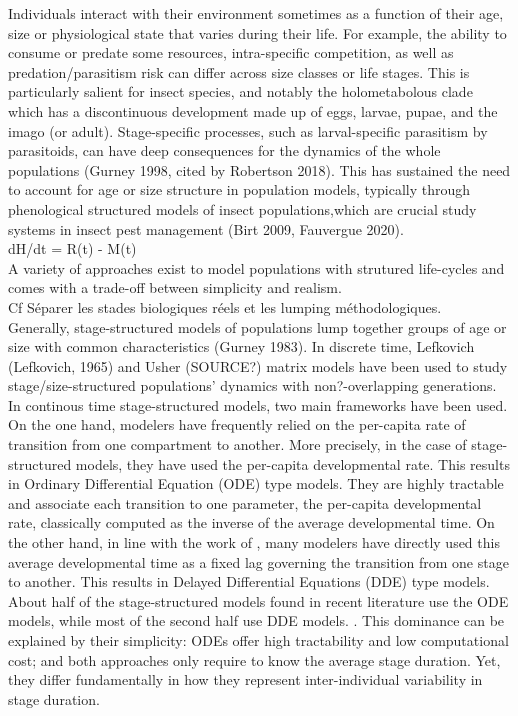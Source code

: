 \documentclass[12pt,a4paper,onecolumn]{article}
\begin{document}
\tabto{1 cm} Individuals interact with their environment sometimes as a function of their age, size or physiological state that varies during their life. For example, the ability to consume or predate some resources, intra-specific competition, as well as predation/parasitism risk can differ across size classes or life stages. This is particularly salient for insect species, and notably the holometabolous clade which has a discontinuous development made up of eggs, larvae, pupae, and the imago (or adult). Stage-specific processes, such as larval-specific parasitism by parasitoids, can have deep consequences for the dynamics of the whole populations (Gurney 1998, cited by Robertson 2018). This has sustained the need to account for age or size structure in population models, typically through phenological  structured models of insect populations,which are crucial study systems in insect pest management (Birt 2009, Fauvergue 2020). \\

dH/dt = R(t) - M(t) \\
\tabto{1 cm}  A variety of approaches exist to model populations with strutured life-cycles and comes with a trade-off between simplicity and realism.\\

\tabto{1 cm} Cf Séparer les stades biologiques réels et les lumping méthodologiques.  \\


\tabto{1 cm} Generally, stage-structured models of populations lump together groups of age or size with common characteristics (Gurney 1983). In discrete time, Lefkovich (Lefkovich, 1965) and Usher (SOURCE?) matrix models have been used to study stage/size-structured populations’ dynamics with non?-overlapping generations. In continous time stage-structured models, two main frameworks have been used. On the one hand, modelers have frequently \textcite{robertson_matter_2018} relied on the per-capita rate of transition from one compartment to another. More precisely, in the case of stage-structured models, they have used the per-capita developmental rate. This results in Ordinary Differential Equation (ODE) type models. They are highly tractable and associate each transition to one parameter, the per-capita developmental rate, classically computed as the inverse of the average developmental time. On the other hand, in line with the work of \textcite{gurney_systematic_1983}, many modelers have directly used this average developmental time as a fixed lag governing the transition from one stage to another. This results in Delayed Differential Equations (DDE) type models. About half of the stage-structured models found in recent literature use the ODE models, while most of the second half use DDE models. \textcite{robertson_matter_2018}. This dominance can be explained by their simplicity: ODEs offer high tractability and low computational cost; and both approaches only require to know the average stage duration. Yet, they differ fundamentally in how they represent inter-individual variability in stage duration. \\
\end{document}
